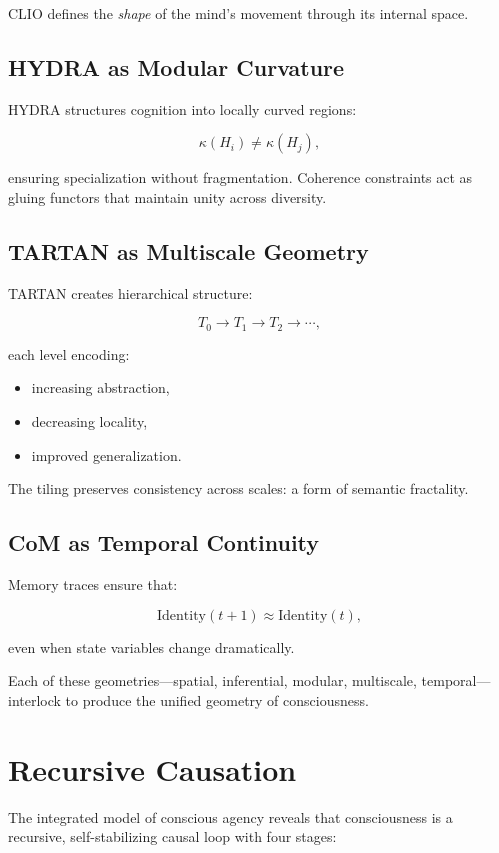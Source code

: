 \documentclass[12pt,oneside]{book}
\theoremstyle{plain}
\theoremstyle{definition}
\begin{document}
CLIO defines the \emph{shape} of the mind’s movement through its internal space.

\subsection{HYDRA as Modular Curvature}

HYDRA structures cognition into locally curved regions:

\[
\kappa(H_i) \neq \kappa(H_j),
\]

ensuring specialization without fragmentation.  
Coherence constraints act as gluing functors that maintain unity across diversity.

\subsection{TARTAN as Multiscale Geometry}

TARTAN creates hierarchical structure:

\[
T_0 \to T_1 \to T_2 \to \cdots,
\]

each level encoding:

\begin{itemize}
    \item increasing abstraction,
    \item decreasing locality,
    \item improved generalization.
\end{itemize}

The tiling preserves consistency across scales:  
a form of semantic fractality.

\subsection{CoM as Temporal Continuity}

Memory traces ensure that:

\[
\mathrm{Identity}(t+1) \approx \mathrm{Identity}(t),
\]

even when state variables change dramatically.

Each of these geometries—spatial, inferential, modular, multiscale, temporal—
interlock to produce the unified geometry of consciousness.

\section{Recursive Causation}

The integrated model of conscious agency reveals that consciousness is a 
recursive, self-stabilizing causal loop with four stages:
\end{document}
